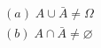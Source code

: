 \documentclass[10pt]{article}
\begin{document}
\begin{align*}(a) \; A\cup\bar{A}\neq \Omega\\
(b)\; A\cap\bar{A}\neq \varnothing 
\end{align*}
\end{document}
